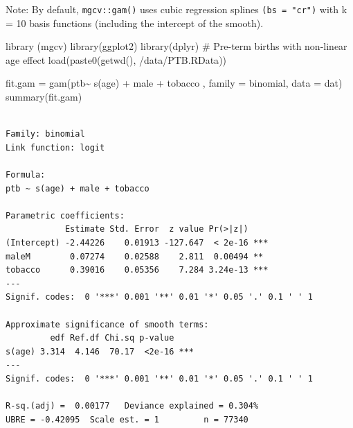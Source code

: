 \documentclass[
  letterpaper,
  DIV=11,
  numbers=noendperiod]{scrreprt}
\newenvironment{Shaded}{\begin{snugshade}}{\end{snugshade}}
\newcommand{\AttributeTok}[1]{\textcolor[rgb]{0.40,0.45,0.13}{#1}}
\newcommand{\CommentTok}[1]{\textcolor[rgb]{0.37,0.37,0.37}{#1}}
\newcommand{\FunctionTok}[1]{\textcolor[rgb]{0.28,0.35,0.67}{#1}}
\newcommand{\NormalTok}[1]{\textcolor[rgb]{0.00,0.23,0.31}{#1}}
\newcommand{\OtherTok}[1]{\textcolor[rgb]{0.00,0.23,0.31}{#1}}
\newcommand{\SpecialCharTok}[1]{\textcolor[rgb]{0.37,0.37,0.37}{#1}}
\newcommand{\StringTok}[1]{\textcolor[rgb]{0.13,0.47,0.30}{#1}}
\begin{document}
\begin{tcolorbox}[enhanced jigsaw, rightrule=.15mm, breakable, left=2mm, colframe=quarto-callout-note-color-frame, opacityback=0, leftrule=.75mm, toprule=.15mm, colback=white, arc=.35mm, bottomrule=.15mm]

Note: By default, \texttt{mgcv::gam()} uses cubic regression splines
\texttt{(bs\ =\ "cr")} with k = 10 basis functions (including the
intercept of the smooth).

\end{tcolorbox}

\begin{Shaded}
\begin{Highlighting}[]
\FunctionTok{library}\NormalTok{ (mgcv)}
\FunctionTok{library}\NormalTok{(ggplot2)}
\FunctionTok{library}\NormalTok{(dplyr)}
\CommentTok{\# Pre{-}term births with non{-}linear age effect}
\FunctionTok{load}\NormalTok{(}\FunctionTok{paste0}\NormalTok{(}\FunctionTok{getwd}\NormalTok{(), }\StringTok{\textquotesingle{}/data/PTB.RData\textquotesingle{}}\NormalTok{))}

\NormalTok{fit.gam }\OtherTok{=} \FunctionTok{gam}\NormalTok{(ptb}\SpecialCharTok{\textasciitilde{}} \FunctionTok{s}\NormalTok{(age) }\SpecialCharTok{+}\NormalTok{ male }\SpecialCharTok{+}\NormalTok{ tobacco ,}
              \AttributeTok{family =}\NormalTok{ binomial, }\AttributeTok{data =}\NormalTok{ dat)}
\FunctionTok{summary}\NormalTok{(fit.gam)}
\end{Highlighting}
\end{Shaded}

\begin{verbatim}

Family: binomial 
Link function: logit 

Formula:
ptb ~ s(age) + male + tobacco

Parametric coefficients:
            Estimate Std. Error  z value Pr(>|z|)    
(Intercept) -2.44226    0.01913 -127.647  < 2e-16 ***
maleM        0.07274    0.02588    2.811  0.00494 ** 
tobacco      0.39016    0.05356    7.284 3.24e-13 ***
---
Signif. codes:  0 '***' 0.001 '**' 0.01 '*' 0.05 '.' 0.1 ' ' 1

Approximate significance of smooth terms:
         edf Ref.df Chi.sq p-value    
s(age) 3.314  4.146  70.17  <2e-16 ***
---
Signif. codes:  0 '***' 0.001 '**' 0.01 '*' 0.05 '.' 0.1 ' ' 1

R-sq.(adj) =  0.00177   Deviance explained = 0.304%
UBRE = -0.42095  Scale est. = 1         n = 77340
\end{verbatim}
\end{document}
